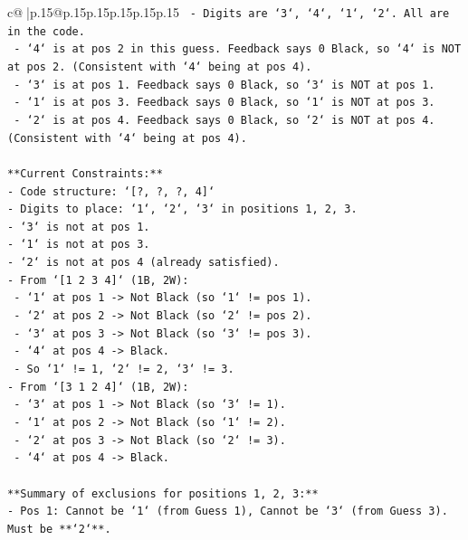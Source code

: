\documentclass{article}
\begin{document}
{\begin{supertabular}{c@{$\;$}|p{.15\linewidth}@{}p{.15\linewidth}p{.15\linewidth}p{.15\linewidth}p{.15\linewidth}p{.15\linewidth}}
{{{\texttt{        {-} Digits are `3`, `4`, `1`, `2`. All are in the code.} \\
\texttt{        {-} `4` is at pos 2 in this guess. Feedback says 0 Black, so `4` is NOT at pos 2. (Consistent with `4` being at pos 4).} \\
\texttt{        {-} `3` is at pos 1. Feedback says 0 Black, so `3` is NOT at pos 1.} \\
\texttt{        {-} `1` is at pos 3. Feedback says 0 Black, so `1` is NOT at pos 3.} \\
\texttt{        {-} `2` is at pos 4. Feedback says 0 Black, so `2` is NOT at pos 4. (Consistent with `4` being at pos 4).} \\
\\ 
\texttt{**Current Constraints:**} \\
\texttt{{-} Code structure: `{[}?, ?, ?, 4{]}`} \\
\texttt{{-} Digits to place: `1`, `2`, `3` in positions 1, 2, 3.} \\
\texttt{{-} `3` is not at pos 1.} \\
\texttt{{-} `1` is not at pos 3.} \\
\texttt{{-} `2` is not at pos 4 (already satisfied).} \\
\texttt{{-} From `{[}1 2 3 4{]}` (1B, 2W):} \\
\texttt{    {-} `1` at pos 1 {-}> Not Black (so `1` != pos 1).} \\
\texttt{    {-} `2` at pos 2 {-}> Not Black (so `2` != pos 2).} \\
\texttt{    {-} `3` at pos 3 {-}> Not Black (so `3` != pos 3).} \\
\texttt{    {-} `4` at pos 4 {-}> Black.} \\
\texttt{    {-} So `1` != 1, `2` != 2, `3` != 3.} \\
\texttt{{-} From `{[}3 1 2 4{]}` (1B, 2W):} \\
\texttt{    {-} `3` at pos 1 {-}> Not Black (so `3` != 1).} \\
\texttt{    {-} `1` at pos 2 {-}> Not Black (so `1` != 2).} \\
\texttt{    {-} `2` at pos 3 {-}> Not Black (so `2` != 3).} \\
\texttt{    {-} `4` at pos 4 {-}> Black.} \\
\\ 
\texttt{**Summary of exclusions for positions 1, 2, 3:**} \\
\texttt{{-} Pos 1: Cannot be `1` (from Guess 1), Cannot be `3` (from Guess 3). Must be **`2`**.} \\
}}}
\end{supertabular}}
\end{document}
